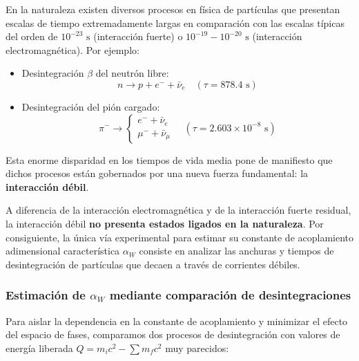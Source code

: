 En la naturaleza existen diversos procesos en física de partículas que presentan escalas de tiempo extremadamente largas en comparación con las escalas típicas del orden de $10^{-23} \text{ s}$ (interacción fuerte) o $10^{-19} - 10^{-20} \text{ s}$ (interacción electromagnética). Por ejemplo:
\begin{itemize}
    \item Desintegración $\beta$ del neutrón libre:
    \begin{equation}
        n \to p + e^- + \bar{\nu}_e \quad (\tau = 878.4 \text{ s})
    \end{equation}
    \item Desintegración del pión cargado:
    \begin{equation}
        \pi^- \to \begin{cases} e^- + \bar{\nu}_e \\ \mu^- + \bar{\nu}_\mu \end{cases} \quad (\tau = 2.603 \times 10^{-8} \text{ s})
    \end{equation}
\end{itemize}

Esta enorme disparidad en los tiempos de vida media pone de manifiesto que dichos procesos están gobernados por una nueva fuerza fundamental: la \textbf{interacción débil}.

A diferencia de la interacción electromagnética y de la interacción fuerte residual, la interacción débil \textbf{no presenta estados ligados en la naturaleza}. Por consiguiente, la única vía experimental para estimar su constante de acoplamiento adimensional característica $\alpha_W$ consiste en analizar las anchuras y tiempos de desintegración de partículas que decaen a través de corrientes débiles.

\subsubsection*{Estimación de $\alpha_W$ mediante comparación de desintegraciones}

Para aislar la dependencia en la constante de acoplamiento y minimizar el efecto del espacio de fases, comparamos dos procesos de desintegración con valores de energía liberada $Q = m_i c^2 - \sum m_f c^2$ muy parecidos:


